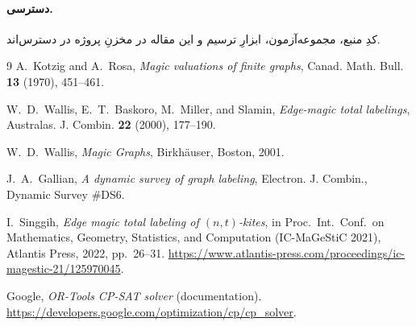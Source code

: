 \documentclass[11pt,a4paper]{article}
\theoremstyle{plain}
\theoremstyle{definition}
\theoremstyle{remark}
\begin{document}
\paragraph{دسترسی.}
کدِ منبع، مجموعه‌آزمون، ابزارِ ترسیم و این مقاله در مخزنِ پروژه در دسترس‌اند.

\begin{thebibliography}{9}
\setLTR\enfont
{}
  A.~Kotzig and A.~Rosa,
  \emph{Magic valuations of finite graphs},
  Canad. Math. Bull. \textbf{13} (1970), 451--461.

  W.~D.~Wallis, E.~T.~Baskoro, M.~Miller, and Slamin,
  \emph{Edge-magic total labelings},
  Australas. J. Combin. \textbf{22} (2000), 177--190.

  W.~D.~Wallis,
  \emph{Magic Graphs},
  Birkh\"auser, Boston, 2001.

  J.~A.~Gallian,
  \emph{A dynamic survey of graph labeling},
  Electron. J. Combin., Dynamic Survey \#DS6.

  I.~Singgih,
  \emph{Edge magic total labeling of $(n,t)$-kites},
  in Proc.\ Int.\ Conf.\ on Mathematics, Geometry, Statistics, and Computation
  (IC-MaGeStiC 2021), Atlantis Press, 2022, pp.\ 26--31.
  \url{https://www.atlantis-press.com/proceedings/ic-magestic-21/125970045}.

  Google,
  \emph{OR-Tools CP-SAT solver} (documentation).
  \url{https://developers.google.com/optimization/cp/cp_solver}.
\end{thebibliography}
\end{document}
